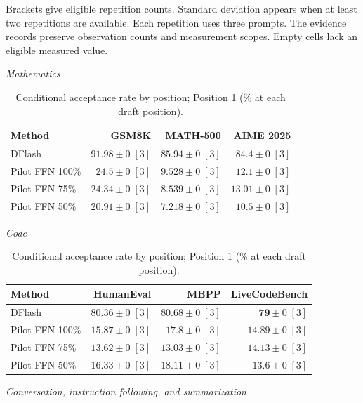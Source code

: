 \documentclass[conference,onecolumn]{IEEEtran}
\begin{document}
\begin{table}[!htp]
\begin{minipage}{\linewidth}
Brackets give eligible repetition counts. Standard deviation appears when at least two repetitions are available. Each repetition uses three prompts. The evidence records preserve observation counts and measurement scopes. Empty cells lack an eligible measured value.
\end{minipage}
\end{table}

\begin{table}[!htp]
\centering\small
\setlength{\tabcolsep}{3pt}
\caption{Conditional acceptance rate by position; Position 1 (\% at each draft position).}
\label{tab:appendix-metric-conditional-acceptance-1}
\textit{Mathematics}\par\smallskip
\begin{tabular}{@{}>{\raggedright\arraybackslash}p{3.7cm}rrr@{}}
\toprule
Method & GSM8K & MATH-500 & AIME 2025 \\
\midrule
DFlash & \(\mathbf{91.98} \pm 0\;[3]\) & \(\mathbf{85.94} \pm 0\;[3]\) & \(\mathbf{84.4} \pm 0\;[3]\) \\
Pilot FFN 100\% & \(24.5 \pm 0\;[3]\) & \(9.528 \pm 0\;[3]\) & \(12.1 \pm 0\;[3]\) \\
Pilot FFN 75\% & \(24.34 \pm 0\;[3]\) & \(8.539 \pm 0\;[3]\) & \(13.01 \pm 0\;[3]\) \\
Pilot FFN 50\% & \(20.91 \pm 0\;[3]\) & \(7.218 \pm 0\;[3]\) & \(10.5 \pm 0\;[3]\) \\
\bottomrule
\end{tabular}\par\medskip
\textit{Code}\par\smallskip
\begin{tabular}{@{}>{\raggedright\arraybackslash}p{3.7cm}rrr@{}}
\toprule
Method & HumanEval & MBPP & LiveCodeBench \\
\midrule
DFlash & \(\mathbf{80.36} \pm 0\;[3]\) & \(\mathbf{80.68} \pm 0\;[3]\) & \(\mathbf{79} \pm 0\;[3]\) \\
Pilot FFN 100\% & \(15.87 \pm 0\;[3]\) & \(17.8 \pm 0\;[3]\) & \(14.89 \pm 0\;[3]\) \\
Pilot FFN 75\% & \(13.62 \pm 0\;[3]\) & \(13.03 \pm 0\;[3]\) & \(14.13 \pm 0\;[3]\) \\
Pilot FFN 50\% & \(16.33 \pm 0\;[3]\) & \(18.11 \pm 0\;[3]\) & \(13.6 \pm 0\;[3]\) \\
\bottomrule
\end{tabular}\par\medskip
\textit{Conversation, instruction following, and summarization}\par\smallskip

\end{table}
\end{document}
